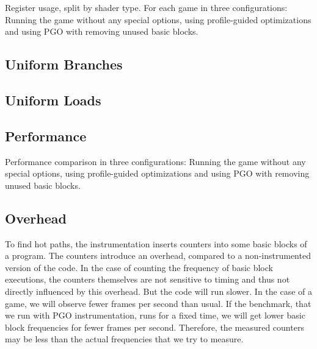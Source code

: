 


Register usage, split by shader type.
For each game in three configurations: Running the game without any special options, using profile-guided optimizations and using PGO with removing unused basic blocks.





\subsection{Uniform Branches}
\label{sub:eval_uniform_branches}



\subsection{Uniform Loads}
\label{sub:eval_uniform_loads}



\subsection{Performance}
\label{sub:eval_perf}
Performance comparison in three configurations: Running the game without any special options, using profile-guided optimizations and using PGO with removing unused basic blocks.



\subsection{Overhead}
\label{sub:overhead}
To find hot paths, the instrumentation inserts counters into some basic blocks of a program. The counters introduce an overhead, compared to a non-instrumented version of the code.
In the case of counting the frequency of basic block executions, the counters themselves are not sensitive to timing and thus not directly influenced by this overhead.
But the code will run slower. In the case of a game, we will observe fewer frames per second than usual.
If the benchmark, that we run with PGO instrumentation, runs for a fixed time, we will get lower basic block frequencies for fewer frames per second.
Therefore, the measured counters may be less than the actual frequencies that we try to measure.


